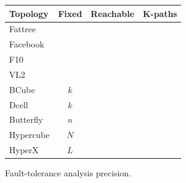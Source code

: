 \documentclass[numbers, 10pt, preprint]{sigplanconf}
\newcommand{\cmark}{\ding{51}}
\newcommand{\xmark}{\ding{55}}
\begin{document}
\begin{figure}[t!]
  \begin{center}
      \begin{tabular}{| l | c | c | c |}
      \hline
      \textbf{Topology} & \textbf{Fixed} & \textbf{Reachable} & \textbf{K-paths} \\ \hline
      Fattree~\cite{fattree} & & \cmark & \cmark  \\ \hline
      Facebook~\cite{facebook-fattree} & & \cmark & \cmark \\ \hline
      F10~\cite{f10-fattree} & & \cmark & \cmark \\ \hline
      VL2~\cite{vl2-fattree} & & & \\ \hline
      BCube~\cite{bcube} & $k$ & \cmark & \xmark \\ \hline
      Dcell~\cite{dcell} & $k$ & \cmark & \xmark \\ \hline
      Butterfly~\cite{butterfly} & $n$ & \cmark & \cmark \\ \hline
      Hypercube & $N$ & \cmark & \cmark \\ \hline
      HyperX~\cite{hyperx} & $L$ & \cmark & \cmark \\ \hline
      \end{tabular}
  \end{center}
  \vspace{-.6em}
  \caption{Fault-tolerance analysis precision.}
  \label{fig:analysis-precision}
  \vspace{-1em}
\end{figure}

\end{document}
